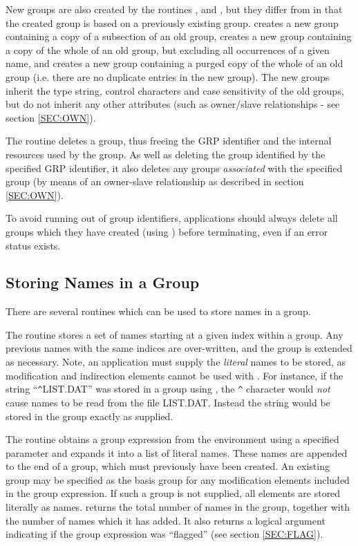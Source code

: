 New groups are also created by the routines ,  and
, but they differ from  in that the created group is based on
a previously existing group.  creates a new group containing a copy of
a subsection of an old group,  creates a new group containing a copy
of the whole of an old group, but excluding all occurrences of a given name, and
 creates a new group containing a purged copy of the whole of an old
group (i.e. there are no duplicate entries in the new group). The new groups
inherit the type string, control characters and case sensitivity of the old
groups, but do not inherit any other attributes (such as owner/slave
relationships - see section \ref {SEC:OWN}).

The routine  deletes a group, thus freeing the GRP identifier and the
internal resources used by the group. As well as deleting the group identified
by the specified GRP identifier, it also deletes any groups {\em associated}
with the specified group (by means of an owner-slave relationship as described
in section \ref{SEC:OWN}).

To avoid running out of group identifiers, applications should always delete all
groups which they have created (using ) before terminating, even if an
error status exists.

\subsection{\label{SEC:ADDN}Storing Names in a Group}
There are several routines which can be used to store names in a group.

The routine  stores a set of names starting at a given index within a
group. Any previous names with the same indices are over-written, and the group
is extended as necessary. Note, an application must supply the {\em literal}
names to be stored, as modification and indirection elements cannot be used with
. For instance, if the string ``\verb+^+LIST.DAT'' was stored in a group
using , the \verb+^+ character would {\em not} cause names to be read
from the file LIST.DAT. Instead the string would be stored in the group exactly
as supplied.

The routine  obtains a group expression from the environment using a
specified parameter and expands it into a list of literal names. These names are
appended to the end of a group, which must previously have been created. An
existing group may be specified as the basis group for any modification elements
included in the group expression. If such a group is not supplied, all elements
are stored literally as names.  returns the total number of names in
the group, together with the number of names which it has added. It also returns
a logical argument indicating if the group expression was ``flagged'' (see
section \ref{SEC:FLAG}).


